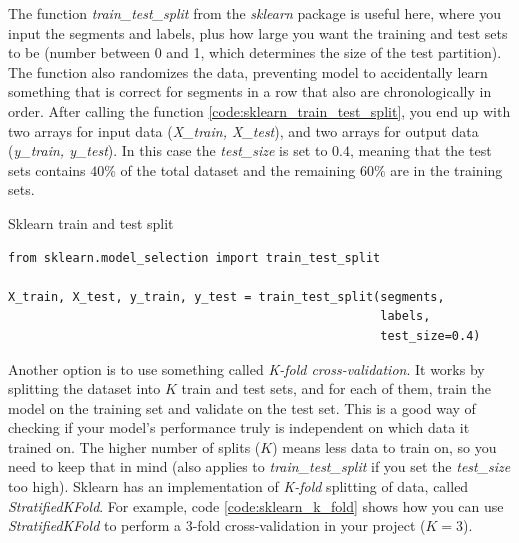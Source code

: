 The function \textit{train\_test\_split} from the \textit{sklearn} package is useful here, where you input the segments and labels, 
plus how large you want the training and test sets to be (number between 0 and 1, which determines the size of the test partition). 
The function also randomizes the data, preventing model to accidentally learn something that is correct for segments in a row that 
also are chronologically in order. After calling the function \ref{code:sklearn_train_test_split}, you end up with two arrays for input data
(\textit{X\_train, X\_test}), and two arrays for output data (\textit{y\_train, y\_test}). In this case the \textit{test\_size} is set to $0.4$, 
meaning that the test sets contains $40\%$ of the total dataset and the remaining $60\%$ are in the training sets.

\begin{code}
    \caption{Sklearn train and test split}
    \label{code:sklearn_train_test_split}
    
    \begin{verbatim}
from sklearn.model_selection import train_test_split

X_train, X_test, y_train, y_test = train_test_split(segments, 
                                                    labels, 
                                                    test_size=0.4)
    \end{verbatim}
\end{code}

\noindent Another option is to use something called \textit{K-fold cross-validation}. It works by splitting the dataset into $K$ train and test sets, 
and for each of them, train the model on the training set and validate on the test set. This is a good way of checking if your model's performance 
truly is independent on which data it trained on. The higher number of splits ($K$) means less data to train on, so you need to keep that in mind 
(also applies to \textit{train\_test\_split} if you set the \textit{test\_size} too high). Sklearn has an implementation of \textit{K-fold} 
splitting of data, called \textit{StratifiedKFold}. For example, code \ref{code:sklearn_k_fold} shows how you can use \textit{StratifiedKFold}
to perform a 3-fold cross-validation in your project ($K = 3$). 

